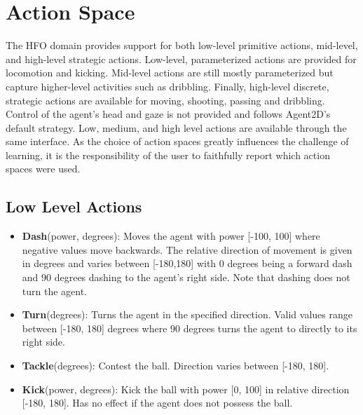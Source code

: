 \documentclass[12pt]{article}
\begin{document}
\section{Action Space}
The HFO domain provides support for both low-level primitive actions,
mid-level, and high-level strategic actions. Low-level, parameterized
actions are provided for locomotion and kicking. Mid-level actions are
still mostly parameterized but capture higher-level activities such as
dribbling. Finally, high-level discrete, strategic actions are
available for moving, shooting, passing and dribbling. Control of the
agent's head and gaze is not provided and follows Agent2D's default
strategy. Low, medium, and high level actions are available through
the same interface. As the choice of action spaces greatly influences
the challenge of learning, it is the responsibility of the user to
faithfully report which action spaces were used.

\subsection{Low Level Actions}
\label{sec:low_level_actions}
\begin{itemize}[noitemsep]
\item{\textbf{Dash}(power, degrees): Moves the agent with power [-100,
    100] where negative values move backwards. The relative direction
  of movement is given in degrees and varies between [-180,180] with 0
  degrees being a forward dash and 90 degrees dashing to the agent's
  right side. Note that dashing does not turn the agent.}
\item{\textbf{Turn}(degrees): Turns the agent in the
  specified direction. Valid values range between [-180, 180] degrees
  where 90 degrees turns the agent to directly to its right side.}
\item{\textbf{Tackle}(degrees): Contest the ball. Direction
  varies between [-180, 180].}
\item{\textbf{Kick}(power, degrees): Kick the ball with power [0, 100]
  in relative direction [-180, 180]. Has no effect if the agent does
  not possess the ball.}
\end{itemize}
\end{document}

